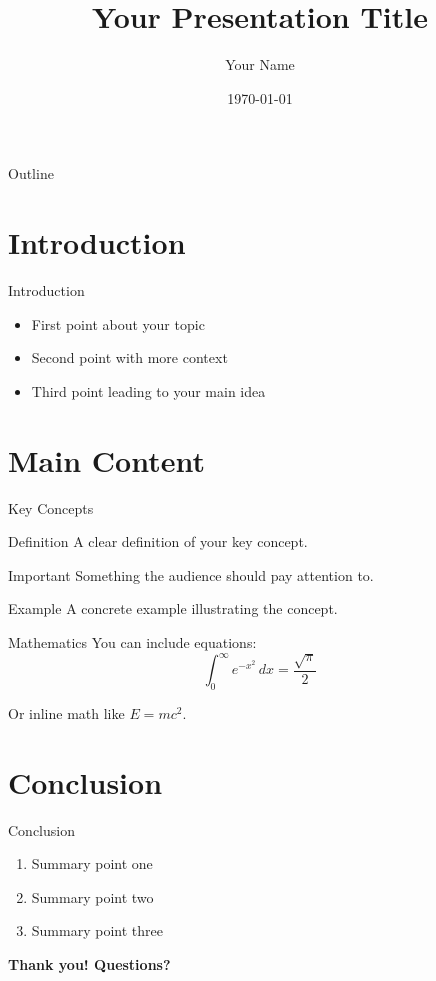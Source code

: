 \documentclass{beamer}
\title{Your Presentation Title}
\author{Your Name}
\institute{Your Institution}
\date{\today}
\begin{document}
\begin{frame}
  \titlepage
\end{frame}

\begin{frame}{Outline}
  \tableofcontents
\end{frame}

\section{Introduction}

\begin{frame}{Introduction}
  \begin{itemize}
    \item First point about your topic
    \item Second point with more context
    \item Third point leading to your main idea
  \end{itemize}
\end{frame}

\section{Main Content}

\begin{frame}{Key Concepts}
  \begin{block}{Definition}
    A clear definition of your key concept.
  \end{block}

  \begin{alertblock}{Important}
    Something the audience should pay attention to.
  \end{alertblock}

  \begin{exampleblock}{Example}
    A concrete example illustrating the concept.
  \end{exampleblock}
\end{frame}

\begin{frame}{Mathematics}
  You can include equations:
  \begin{equation}
    \int_0^\infty e^{-x^2} \, dx = \frac{\sqrt{\pi}}{2}
  \end{equation}

  Or inline math like $E = mc^2$.
\end{frame}

\section{Conclusion}

\begin{frame}{Conclusion}
  \begin{enumerate}
    \item Summary point one
    \item Summary point two
    \item Summary point three
  \end{enumerate}

  \begin{center}
    \textbf{Thank you! Questions?}
  \end{center}
\end{frame}
\end{document}
